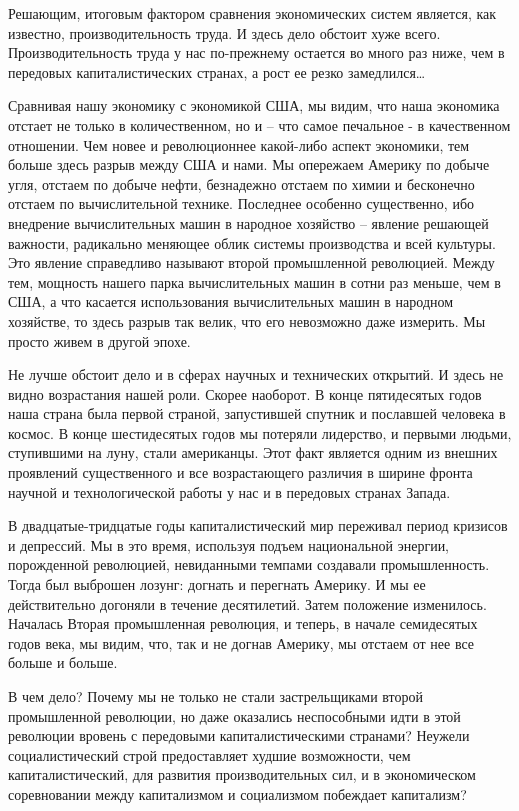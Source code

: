 \documentclass{book}
\begin{document}
Решающим, итоговым фактором сравнения экономических систем является, как известно, производительность труда. И здесь дело 
обстоит хуже всего. Производительность труда у нас по-прежнему остается во много раз ниже, чем в передовых ка­питалистических 
странах, а рост ее резко замедлился\ldots

Сравнивая нашу экономику с экономикой США, мы видим, что наша экономика отстает не только в количественном, но и -- что самое 
печальное - в качественном отношении. Чем новее и революционнее какой-либо аспект экономики, тем больше здесь разрыв между США и 
нами. Мы опережаем Америку по добыче угля, отстаем по добыче нефти, безнадежно отстаем по химии и бесконечно отстаем по 
вычислительной технике. Пос­леднее особенно существенно, ибо внедрение вычислительных машин в народное хозяйство -- явление 
решающей важности, радикально меняющее облик системы производства и всей культуры. Это явление справедливо называют второй 
промышленной революцией. Между тем, мощность нашего парка вычислительных машин в сотни раз  меньше, чем в США, а что касается 
использования вычислительных машин в народном хозяйстве, то здесь разрыв так велик, что его невозможно даже измерить. Мы просто 
живем в другой эпохе.

Не лучше обстоит дело и в сферах научных и технических открытий. И здесь не видно возрастания нашей роли. Скорее наоборот. В 
конце пятидесятых годов наша страна была первой страной, запустившей спутник и пославшей человека в кос­мос. В конце шестидесятых 
годов мы потеряли лидерство, и первыми людьми, ступившими на луну, стали американцы. Этот факт является одним из внешних 
проявлений существен­ного и все возрастающего различия в ширине фронта научной и технологической работы у нас и в передовых 
странах Запада.

В двадцатые-тридцатые годы капиталистический мир переживал период кризисов и депрессий. Мы в это время, исполь­зуя подъем 
национальной энергии, порожденной революцией, невиданными темпами создавали промышленность. Тогда был выброшен лозунг: догнать и 
перегнать Америку. И мы ее действительно догоняли в течение десятилетий. Затем положение изменилось. Началась Вторая 
промышленная революция, и те­перь, в начале семидесятых годов века, мы видим, что, так и не догнав Америку, мы отстаем от нее все 
больше и больше.

В чем дело? Почему мы не только не стали застрельщиками второй промышленной революции, но даже оказались неспособ­ными идти в 
этой революции вровень с передовыми капиталистическими странами? Неужели социалистический строй предоставляет худшие 
возможности, чем капиталистический, для развития производительных сил, и в экономическом соревновании между капитализмом и 
социализмом побеждает капитализм?
\end{document}
